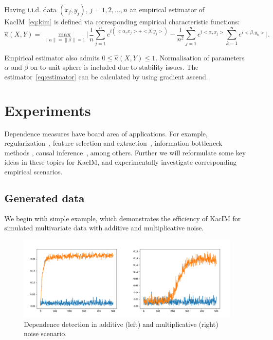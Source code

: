 \documentclass{article}
\begin{document}
Having i.i.d. data $(x_{j}, y_{j})$, $j = 1,2,...,n$ an empirical estimator of KacIM~\eqref{eq:kim} is defined via corresponding empirical characteristic functions:
\begin{equation}
\label{eq:estimator}
    \hat{\kappa}(X,Y) = \max_{\|\alpha\| = \|\beta\| = 1} \vert \frac{1}{n} \sum_{j=1}^{n} e^{i(<\alpha, x_{j}> + <\beta, y_{j}>) } - \frac{1}{n^2} \sum_{j=1}^{n} e^{i <\alpha, x_{j}>}\sum_{k=1}^{n} e^{i<\beta, y_{k}>}\vert.
\end{equation}

\noindent Empirical estimator also admits $0 \leq \hat{\kappa}(X,Y) \leq 1$. Normalisation of parameters $\alpha$ and $\beta$ on to unit sphere is included due to stability issues. The  estimator~\eqref{eq:estimator} can be calculated by using gradient ascend.

\section{Experiments}
Dependence measures have board area of applications. For example, regularization~\cite{?,?}, feature selection and extraction~\cite{?}, information bottleneck methods \cite{?}, causal inference~\cite{?}, among others. Further we will reformulate some key ideas in these topics for KacIM, and experimentally investigate corresponding empirical scenarios.


\subsection{Generated data}

We begin with simple example, which demonstrates the efficiency of KacIM for simulated multivariate data with additive and multiplicative noise.

\begin{figure}[t]
\label{fig:experiments_simulation}
\centering
\includegraphics[scale=0.25]{./out.png}
\caption{Dependence detection in additive (left) and multiplicative (right) noise scenario.}
\end{figure}
\end{document}
